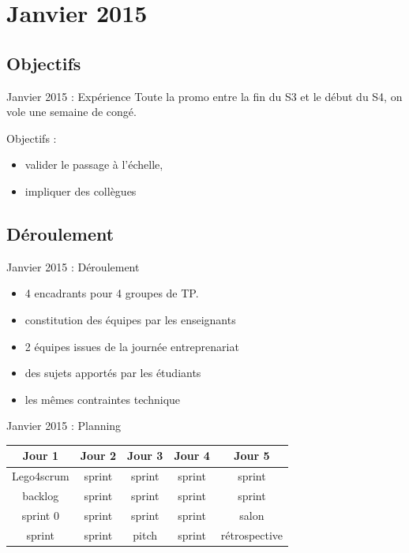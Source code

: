 \documentclass{beamer}
\begin{document}
\section{Janvier 2015}
\subsection{Objectifs}
\begin{frame}{Janvier 2015 : Expérience}
  Toute la promo entre la fin du S3 et le début du S4, on vole une semaine de congé.

  Objectifs : 
  \begin{itemize}
    \item valider le passage à l'échelle, 
    \item impliquer des collègues
  \end{itemize}
\end{frame}

\subsection{Déroulement}
\begin{frame}{Janvier 2015 : Déroulement}
  \begin{itemize}
    \item 4 encadrants pour 4 groupes de TP.
    \item constitution des équipes par les enseignants
    \item 2 équipes issues de la journée entreprenariat
    \item des sujets apportés par les étudiants
    \item les mêmes contraintes technique
  \end{itemize}
\end{frame}

\begin{frame}{Janvier 2015 : Planning}
  \begin{center}
    \begin{tabular}{| c | c | c | c | c |}
      \hline
      \textbf{Jour 1} & \textbf{Jour 2} & \textbf{Jour 3} & \textbf{Jour 4} & \textbf{Jour 5} \\
      \hline \hline
      Lego4scrum      & sprint          & sprint          & sprint          & sprint          \\
      \hline
      backlog         & sprint          & sprint          & sprint          & sprint          \\
      \hline \hline
      sprint 0        & sprint          & sprint          & sprint          & salon           \\
      \hline
      sprint          & sprint          & pitch           & sprint          & rétrospective   \\
      \hline
    \end{tabular}
  \end{center}
\end{frame}
\end{document}
